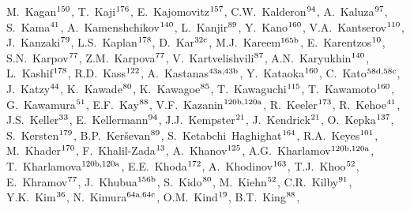 \begin{flushleft}
M.~Kagan$^\textrm{\scriptsize 150}$,    
T.~Kaji$^\textrm{\scriptsize 176}$,    
E.~Kajomovitz$^\textrm{\scriptsize 157}$,    
C.W.~Kalderon$^\textrm{\scriptsize 94}$,    
A.~Kaluza$^\textrm{\scriptsize 97}$,    
S.~Kama$^\textrm{\scriptsize 41}$,    
A.~Kamenshchikov$^\textrm{\scriptsize 140}$,    
L.~Kanjir$^\textrm{\scriptsize 89}$,    
Y.~Kano$^\textrm{\scriptsize 160}$,    
V.A.~Kantserov$^\textrm{\scriptsize 110}$,    
J.~Kanzaki$^\textrm{\scriptsize 79}$,    
L.S.~Kaplan$^\textrm{\scriptsize 178}$,    
D.~Kar$^\textrm{\scriptsize 32c}$,    
M.J.~Kareem$^\textrm{\scriptsize 165b}$,    
E.~Karentzos$^\textrm{\scriptsize 10}$,    
S.N.~Karpov$^\textrm{\scriptsize 77}$,    
Z.M.~Karpova$^\textrm{\scriptsize 77}$,    
V.~Kartvelishvili$^\textrm{\scriptsize 87}$,    
A.N.~Karyukhin$^\textrm{\scriptsize 140}$,    
L.~Kashif$^\textrm{\scriptsize 178}$,    
R.D.~Kass$^\textrm{\scriptsize 122}$,    
A.~Kastanas$^\textrm{\scriptsize 43a,43b}$,    
Y.~Kataoka$^\textrm{\scriptsize 160}$,    
C.~Kato$^\textrm{\scriptsize 58d,58c}$,    
J.~Katzy$^\textrm{\scriptsize 44}$,    
K.~Kawade$^\textrm{\scriptsize 80}$,    
K.~Kawagoe$^\textrm{\scriptsize 85}$,    
T.~Kawaguchi$^\textrm{\scriptsize 115}$,    
T.~Kawamoto$^\textrm{\scriptsize 160}$,    
G.~Kawamura$^\textrm{\scriptsize 51}$,    
E.F.~Kay$^\textrm{\scriptsize 88}$,    
V.F.~Kazanin$^\textrm{\scriptsize 120b,120a}$,    
R.~Keeler$^\textrm{\scriptsize 173}$,    
R.~Kehoe$^\textrm{\scriptsize 41}$,    
J.S.~Keller$^\textrm{\scriptsize 33}$,    
E.~Kellermann$^\textrm{\scriptsize 94}$,    
J.J.~Kempster$^\textrm{\scriptsize 21}$,    
J.~Kendrick$^\textrm{\scriptsize 21}$,    
O.~Kepka$^\textrm{\scriptsize 137}$,    
S.~Kersten$^\textrm{\scriptsize 179}$,    
B.P.~Ker\v{s}evan$^\textrm{\scriptsize 89}$,    
S.~Ketabchi~Haghighat$^\textrm{\scriptsize 164}$,    
R.A.~Keyes$^\textrm{\scriptsize 101}$,    
M.~Khader$^\textrm{\scriptsize 170}$,    
F.~Khalil-Zada$^\textrm{\scriptsize 13}$,    
A.~Khanov$^\textrm{\scriptsize 125}$,    
A.G.~Kharlamov$^\textrm{\scriptsize 120b,120a}$,    
T.~Kharlamova$^\textrm{\scriptsize 120b,120a}$,    
E.E.~Khoda$^\textrm{\scriptsize 172}$,    
A.~Khodinov$^\textrm{\scriptsize 163}$,    
T.J.~Khoo$^\textrm{\scriptsize 52}$,    
E.~Khramov$^\textrm{\scriptsize 77}$,    
J.~Khubua$^\textrm{\scriptsize 156b}$,    
S.~Kido$^\textrm{\scriptsize 80}$,    
M.~Kiehn$^\textrm{\scriptsize 52}$,    
C.R.~Kilby$^\textrm{\scriptsize 91}$,    
Y.K.~Kim$^\textrm{\scriptsize 36}$,    
N.~Kimura$^\textrm{\scriptsize 64a,64c}$,    
O.M.~Kind$^\textrm{\scriptsize 19}$,    
B.T.~King$^\textrm{\scriptsize 88}$,    

\end{flushleft}
